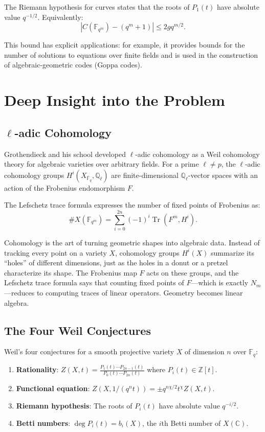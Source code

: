 The Riemann hypothesis for curves states that the roots of $P_1(t)$ have absolute value $q^{-1/2}$. Equivalently:
\[
|C(\mathbb{F}_{q^m}) - (q^m + 1)| \leq 2g q^{m/2}.
\]

This bound has explicit applications: for example, it provides bounds for the number of solutions to equations over finite fields and is used in the construction of algebraic-geometric codes (Goppa codes).

\section{Deep Insight into the Problem}

\subsection{\texorpdfstring{$\ell$}{l}-adic Cohomology}

Grothendieck and his school developed $\ell$-adic cohomology as a Weil cohomology theory for algebraic varieties over arbitrary fields. For a prime $\ell \neq p$, the $\ell$-adic cohomology groups $H^i(X_{\overline{\mathbb{F}}_q}, \mathbb{Q}_\ell)$ are finite-dimensional $\mathbb{Q}_\ell$-vector spaces with an action of the Frobenius endomorphism $F$.

The Lefschetz trace formula expresses the number of fixed points of Frobenius as:
\[
\#X(\mathbb{F}_{q^m}) = \sum_{i=0}^{2n} (-1)^i \operatorname{Tr}(F^m, H^i).
\]

\begin{bigidea}
Cohomology is the art of turning geometric shapes into algebraic data. Instead of tracking every point on a variety $X$, cohomology groups $H^i(X)$ summarize its ``holes'' of different dimensions, just as the holes in a donut or a pretzel characterize its shape. The Frobenius map $F$ acts on these groups, and the Lefschetz trace formula says that counting fixed points of $F$---which is exactly $N_m$---reduces to computing traces of linear operators. Geometry becomes linear algebra.
\end{bigidea}

\subsection{The Four Weil Conjectures}

Weil's four conjectures for a smooth projective variety $X$ of dimension $n$ over $\mathbb{F}_q$:
\begin{enumerate}
\item \textbf{Rationality}: $Z(X, t) = \frac{P_1(t) \cdots P_{2n-1}(t)}{P_0(t) \cdots P_{2n}(t)}$ where $P_i(t) \in \mathbb{Z}[t]$.
\item \textbf{Functional equation}: $Z(X, 1/(q^n t)) = \pm q^{n\chi/2} t^\chi Z(X, t)$.
\item \textbf{Riemann hypothesis}: The roots of $P_i(t)$ have absolute value $q^{-i/2}$.
\item \textbf{Betti numbers}: $\deg P_i(t) = b_i(X)$, the $i$th Betti number of $X(\mathbb{C})$.
\end{enumerate}

